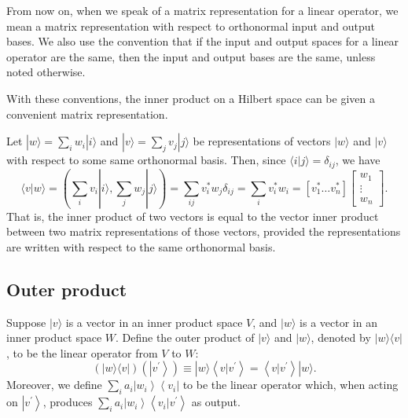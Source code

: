 \documentclass[
	11pt, %
	fleqn, %
	a4paper, %
]{LegrandOrangeBook}
\begin{document}

\begin{remark}
    From now on, when we speak of a matrix representation for a linear operator, we mean a matrix representation with respect to orthonormal input and output bases. We also use the convention that if the input and output spaces for a linear operator are the same, then the input and output bases are the same, unless noted otherwise.
\end{remark}

With these conventions, the inner product on a Hilbert space can be given a convenient matrix representation. 

Let $|w\rangle=\sum_{i} w_{i}|i\rangle$ and $|v\rangle=\sum_{j} v_{j}|j\rangle$ be representations of vectors $|w\rangle$ and $|v\rangle$ with respect to some same orthonormal basis. Then, since $\langle i | j\rangle=\delta_{i j}$, we have
$$
\langle v | w\rangle 
=\left(\sum_{i} v_{i}|i\rangle, \sum_{j} w_{j}|j\rangle\right)=\sum_{i j} v_{i}^{*} w_{j} \delta_{i j}
=\sum_{i} v_{i}^{*} w_{i}
=\left[v_{1}^{*} \ldots v_{n}^{*}\right]\left[\begin{array}{c}
w_{1} \\
\vdots \\
w_{n}
\end{array}\right].
$$
That is, the inner product of two vectors is equal to the vector inner product between two matrix representations of those vectors, provided the representations are written with respect to the same orthonormal basis. 


\subsection{Outer product} %


Suppose $|v\rangle$ is a vector in an inner product space $V$, and $|w\rangle$ is a vector in an inner product space $W$. Define the outer product of $|v\rangle$ and $|w\rangle$, denoted by $|w\rangle\langle v|$, to be the linear operator from $V$ to $W$:
$$
(|w\rangle\langle v|)\left(\left|v^{\prime}\right\rangle\right) \equiv|w\rangle\left\langle v | v^{\prime}\right\rangle=\left\langle v | v^{\prime}\right\rangle|w\rangle.
$$
Moreover, we define $\sum_{i} a_{i}\left|w_{i}\right\rangle\left\langle v_{i}\right|$ to be the linear operator which, when acting on $\left|v^{\prime}\right\rangle$, produces $\sum_{i} a_{i}\left|w_{i}\right\rangle\left\langle v_{i} | v^{\prime}\right\rangle$ as output.
\end{document}
